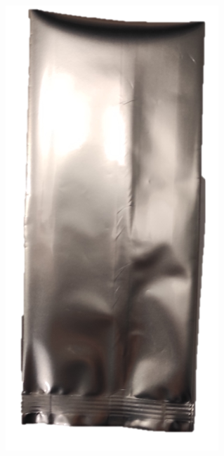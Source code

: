 \begin{refsection}
 \begin{figure}[h]
    \centering
    \begin{subfigure}[b]{0.3\linewidth}           \centering
        \includegraphics[width=0.5\linewidth]{Documento_Latex/Tesis 2/Imagenes/Non_Sealed_Bag.png}
        \label{fig:non_sealed_bag}
    \end{subfigure}
    \begin{subfigure}[b]{0.3\linewidth}
        \centering

\end{subfigure}
\end{figure}
\end{refsection}
